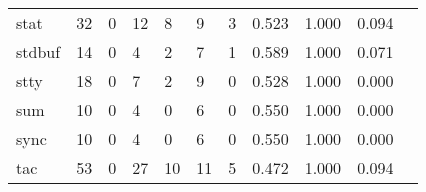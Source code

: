 \begin{longtable}{lp{1.2cm}p{1.2cm}p{1.2cm}p{1.2cm}p{1.2cm}p{1.2cm}p{1.2cm}p{1.2cm}p{1.2cm}p{1.2cm}}
stat      &                                    32 &                                                  0 &                                                 12 &                                                  8 &                                                  9 &                                                  3 &                                         0.523 &                                              1.000 &                                              0.094 \\
stdbuf    &                                    14 &                                                  0 &                                                  4 &                                                  2 &                                                  7 &                                                  1 &                                         0.589 &                                              1.000 &                                              0.071 \\
stty      &                                    18 &                                                  0 &                                                  7 &                                                  2 &                                                  9 &                                                  0 &                                         0.528 &                                              1.000 &                                              0.000 \\
sum       &                                    10 &                                                  0 &                                                  4 &                                                  0 &                                                  6 &                                                  0 &                                         0.550 &                                              1.000 &                                              0.000 \\
sync      &                                    10 &                                                  0 &                                                  4 &                                                  0 &                                                  6 &                                                  0 &                                         0.550 &                                              1.000 &                                              0.000 \\
tac       &                                    53 &                                                  0 &                                                 27 &                                                 10 &                                                 11 &                                                  5 &                                         0.472 &                                              1.000 &                                              0.094 \\

\end{longtable}
